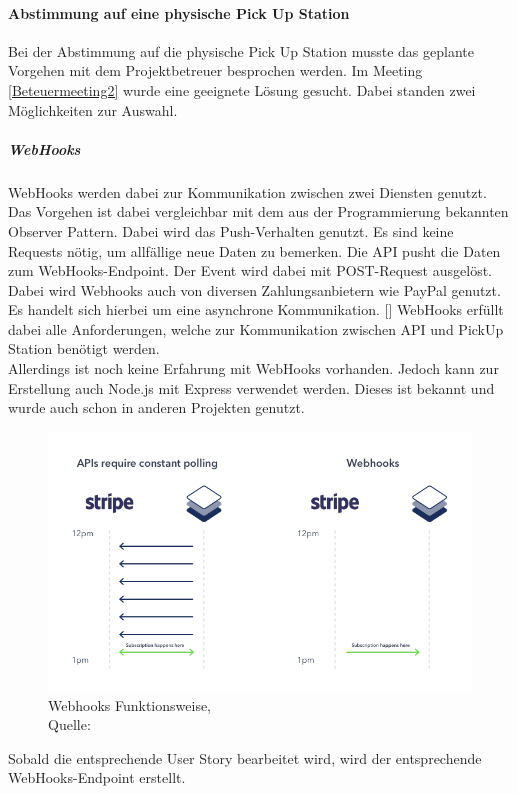 \paragraph{Abstimmung auf eine physische Pick Up Station}
Bei der Abstimmung auf die physische Pick Up Station musste das geplante Vorgehen mit dem Projektbetreuer besprochen werden. Im Meeting \ref{Beteuermeeting2} wurde eine geeignete Lösung gesucht. Dabei standen zwei Möglichkeiten zur Auswahl. 
\subparagraph{WebHooks}
WebHooks werden dabei zur Kommunikation zwischen zwei Diensten genutzt. Das Vorgehen ist dabei vergleichbar mit dem aus der Programmierung bekannten Observer Pattern. Dabei wird das Push-Verhalten genutzt. Es sind keine Requests nötig, um allfällige neue Daten zu bemerken. Die API pusht die Daten zum WebHooks-Endpoint. Der Event wird dabei mit POST-Request ausgelöst. Dabei wird Webhooks auch von diversen Zahlungsanbietern wie PayPal genutzt. Es handelt sich hierbei um eine asynchrone Kommunikation. [\cite{webhooksExplained}] WebHooks erfüllt dabei alle Anforderungen, welche zur Kommunikation zwischen API und PickUp Station benötigt werden.  \\Allerdings ist noch keine Erfahrung mit WebHooks vorhanden. Jedoch kann zur Erstellung auch Node.js mit Express verwendet werden. Dieses ist bekannt und wurde auch schon in anderen Projekten genutzt. 

\begin{figure}[H]
	\centering
	\includegraphics[width=1\textwidth]{images/webhooks_fun.png}
	\caption[Webhooks Funktionsweise]{Webhooks Funktionsweise,\\ Quelle: \cite{webhooksImage}}
	\label{img: webhooks_fun}
\end{figure}

Sobald die entsprechende User Story bearbeitet wird, wird der entsprechende WebHooks-Endpoint erstellt. 

